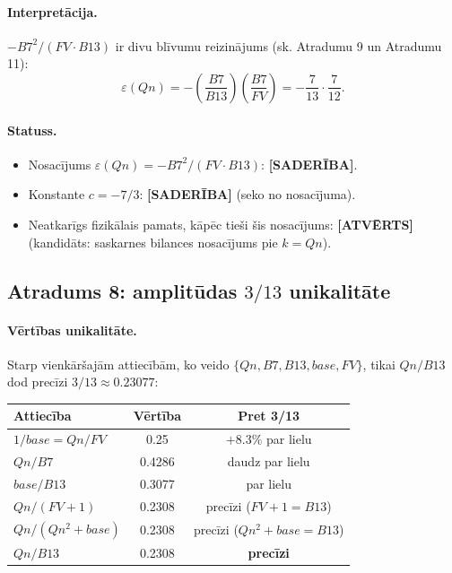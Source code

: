 \documentclass[12pt,a4paper]{article}
\begin{document}
\paragraph{Interpretācija.}
$-B7^2/(FV \cdot B13)$ ir divu blīvumu reizinājums (sk. Atradumu 9 un Atradumu 11):
\[
\varepsilon(Qn) = -\left(\frac{B7}{B13}\right)\left(\frac{B7}{FV}\right) = -\frac{7}{13} \cdot \frac{7}{12}.
\]

\paragraph{Statuss.}
\begin{itemize}
    \item Nosacījums $\varepsilon(Qn) = -B7^2/(FV \cdot B13)$: \textbf{[SADERĪBA]}.
    \item Konstante $c = -7/3$: \textbf{[SADERĪBA]} (seko no nosacījuma).
    \item Neatkarīgs fizikālais pamats, kāpēc tieši šis nosacījums: \textbf{[ATVĒRTS]} (kandidāts: saskarnes bilances nosacījums pie $k = Qn$).
\end{itemize}

\subsection*{Atradums 8: amplitūdas $3/13$ unikalitāte}

\paragraph{Vērtības unikalitāte.}
Starp vienkāršajām attiecībām, ko veido $\{Qn, B7, B13, base, FV\}$, tikai $Qn/B13$ dod precīzi $3/13 \approx 0.23077$:

\begin{table}[h]
\centering
\begin{tabular}{|l|c|c|}
\hline
\textbf{Attiecība} & \textbf{Vērtība} & \textbf{Pret 3/13} \\
\hline
$1/base = Qn/FV$ & 0.25 & $+8.3\%$ par lielu \\
$Qn/B7$ & 0.4286 & daudz par lielu \\
$base/B13$ & 0.3077 & par lielu \\
$Qn/(FV+1)$ & 0.2308 & precīzi ($FV+1 = B13$) \\
$Qn/(Qn^2+base)$ & 0.2308 & precīzi ($Qn^2+base = B13$) \\
$Qn/B13$ & 0.2308 & \textbf{precīzi} \\
\hline
\end{tabular}
\end{table}
\end{document}
